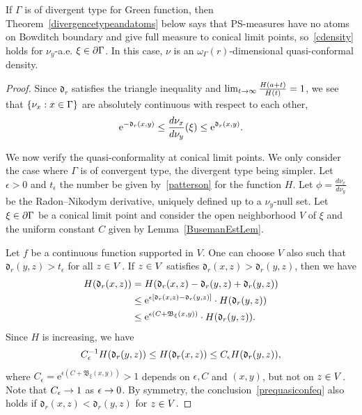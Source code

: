\documentclass[AHL,Unicode,longabstracts]{cedram}
\newcommand{\pG}{\partial{\Gamma}}
\newcommand{\rme}{\mathrm{e}}
\newcommand{\fkd}{\mathfrak{d}}
\newcommand{\fkB}{\mathfrak{B}}
\let\oldin\in
\renewcommand{\in}{\mathchoice{\oldin}{\oldin}{\,\oldin\,}{\,\oldin\,}}
\let\oldle\le
\renewcommand{\le}{\mathchoice{\oldle}{\oldle}{\,\oldle\,}{\,\oldle\,}}
\renewcommand*{\to}{\mathchoice{\longrightarrow}{\rightarrow}{\rightarrow}{\rightarrow}}
\begin{document}
\begin{rema}
If $\Gamma$ is of divergent type for Green function, then Theorem~\ref{divergencetypeandatoms} below says that PS-measures have no atoms on Bowditch boundary and give full measure to conical limit points, so~\eqref{cdensity} holds for $\nu_y$-a.e. $\xi\in \pG$. In this case, $\nu$ is an $\omega_\Gamma(r)$-dimensional quasi-conformal density.
\end{rema}
\begin{proof}
Since $\fkd_r$ satisfies the triangle inequality and $\lim_{t\to\infty} \frac{H(a+t)}{H(t)}=1$, we see that $\{\nu_x: x\in \Gamma\}$ are absolutely continuous with respect to each other,
\begin{align*}
\rme^{-\fkd_r(x,y)}\le \frac{d\nu_x}{d\nu_y}(\xi) \le \rme^{\fkd_r(x,y)}.
\end{align*}


We now verify the quasi-conformality at conical limit points. We only consider the case where $\Gamma$ is of convergent type, the divergent type being simpler. Let $\epsilon> 0$ and $t_\epsilon$ the number be given by~\eqref{patterson} for the function $H$. Let $\phi=\frac{d\nu_x}{d\nu_y}$ be the Radon--Nikodym derivative, uniquely defined up to a $\nu_y$-null set. Let $\xi \in \pG$ be a conical limit point and consider the open neighborhood $V$ of $\xi$ and the uniform constant $C$ given by Lemma~\ref{BusemanEstLem}.

Let $f$ be a continuous function supported in $V$. One can choose $V$ also such that $\fkd_r(y, z) > t_\epsilon$ for all $z \in V$. If $z \in V$ satisfies $\fkd_r(x, z) >\fkd_r(y, z)$, then we have
\begin{align*}
H(\fkd_r(x,z)) &= H(\fkd_r(x,z)-\fkd_r(y,z)+\fkd_r(y,z)) \\
& \le \rme^{\epsilon[\fkd_r(x,z)-\fkd_r(y,z)]} \cdot H(\fkd_r(y,z)) \\
& \le \rme^{\epsilon (C + \fkB_\xi(x, y))}\cdot H(\fkd_r(y, z)).
\end{align*}
Since $H$ is increasing, we have
\begin{equation}\label{prequasiconfeq}
C_\epsilon^{-1} H(\fkd_r(y, z))\le H(\fkd_r(x, z)) \le C_\epsilon H(\fkd_r(y, z)),
\end{equation}
where $C_\epsilon= \rme^{\epsilon (C + \fkB_\xi(x, y))}>1$ depends on $\epsilon, C$ and $ (x,y)$, but not on $z\in V$. Note that $C_\epsilon\to 1$ as $\epsilon\to 0$. By symmetry, the conclusion~\eqref{prequasiconfeq} also holds if $\fkd_r(x, z) < \fkd_r(y, z)$ for $z \in V$.


\end{proof}
\end{document}
